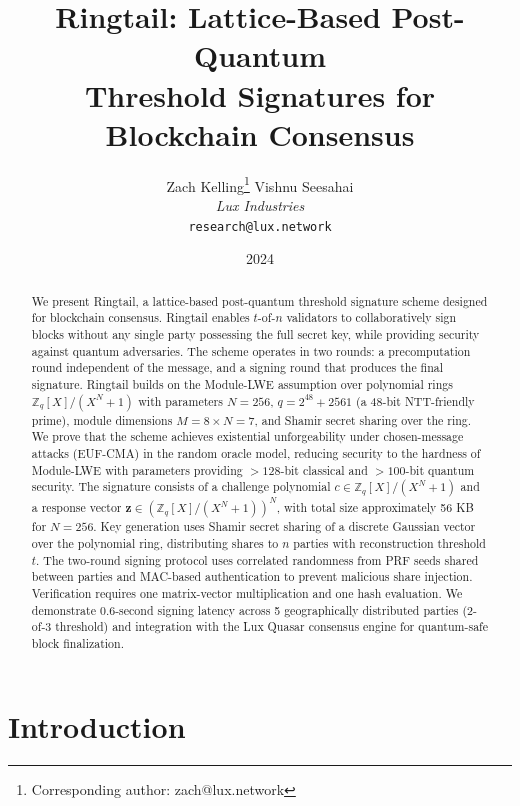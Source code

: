 \documentclass[11pt,a4paper]{article}
\title{\textbf{Ringtail: Lattice-Based Post-Quantum\\Threshold Signatures for Blockchain Consensus}}
\author{
Zach Kelling\thanks{Corresponding author: zach@lux.network}
\quad
Vishnu Seesahai\\
\textit{Lux Industries}\\
\texttt{research@lux.network}
}
\date{2024}
\begin{document}
\luxcoverpage
\maketitle

\begin{abstract}
We present Ringtail, a lattice-based post-quantum threshold signature scheme designed
for blockchain consensus. Ringtail enables $t$-of-$n$ validators to collaboratively
sign blocks without any single party possessing the full secret key, while providing
security against quantum adversaries. The scheme operates in two rounds: a precomputation
round independent of the message, and a signing round that produces the final signature.
Ringtail builds on the Module-LWE assumption over polynomial rings $\mathbb{Z}_q[X]/(X^N + 1)$
with parameters $N = 256$, $q = 2^{48} + 2561$ (a 48-bit NTT-friendly prime), module
dimensions $M = 8 \times N = 7$, and Shamir secret sharing over the ring.
We prove that the scheme achieves existential unforgeability under chosen-message
attacks (EUF-CMA) in the random oracle model, reducing security to the hardness of
Module-LWE with parameters providing $> 128$-bit classical and $> 100$-bit quantum
security. The signature consists of a challenge polynomial $c \in \mathbb{Z}_q[X]/(X^N+1)$
and a response vector $\mathbf{z} \in (\mathbb{Z}_q[X]/(X^N+1))^N$, with total size
approximately 56 KB for $N = 256$.
Key generation uses Shamir secret sharing of a discrete Gaussian vector over the
polynomial ring, distributing shares to $n$ parties with reconstruction threshold $t$.
The two-round signing protocol uses correlated randomness from PRF seeds shared
between parties and MAC-based authentication to prevent malicious share injection.
Verification requires one matrix-vector multiplication and one hash evaluation.
We demonstrate 0.6-second signing latency across 5 geographically distributed parties
(2-of-3 threshold) and integration with the Lux Quasar consensus engine for quantum-safe
block finalization.
\end{abstract}

\tableofcontents
\newpage

\section{Introduction}
\label{sec:introduction}
\end{document}

